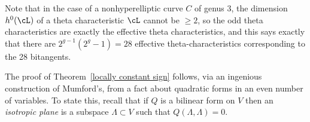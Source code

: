 
Note that in the case of a nonhyperelliptic curve $C$ of genus 3, the dimension $h^0(\cL)$ of a theta characteristic $\cL$ cannot be $\geq 2$, so
the odd theta characteristics are exactly the effective theta characteristics, and  this says exactly that there are $2^{g-1}(2^g-1) = 28$ effective theta-characteristics corresponding to the 28 bitangents.

The proof of Theorem~\ref{locally constant sign} follows, via an ingenious construction of Mumford's, from a  fact about quadratic forms in an even number of variables.
To state this, recall that if $Q$ is a  bilinear form on $V$ then an \emph{isotropic plane} is a subspace $\Lambda \subset V$ such that $Q(\Lambda, \Lambda) = 0$. 


